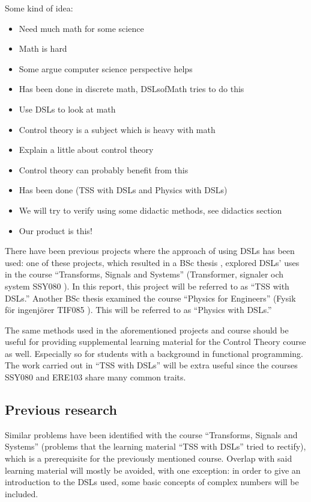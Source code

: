 \iffalse
Some kind of idea:
\begin{itemize}
    \item Need much math for some science
    \item Math is hard
    \item Some argue computer science perspective helps 
    \item Has been done in discrete math, DSLsofMath tries to do this %
    \item Use DSLs to look at math
    \item Control theory is a subject which is heavy with math
    \item Explain a little about control theory
    \item Control theory can probably benefit from this
    \item Has been done (TSS with DSLs and Physics with DSLs)
    \item We will try to verify using some didactic methods, see didactics section
    \item Our product is this!
\end{itemize}

There have been previous projects where the approach of using DSLs has been used: one of these projects, which resulted in a BSc thesis \cite{tssarbete}, explored DSLs' uses in the course ``Transforms, Signals and Systems'' (Transformer, signaler och system SSY080 \cite{SSY080}). In this report, this project will be referred to as ``TSS with DSLs.''
Another BSc thesis \cite{fysikarbete} examined the course ``Physics for Engineers'' (Fysik för ingenjörer TIF085 \cite{TIF085}). This will be referred to as ``Physics with DSLs.''

The same methods used in the aforementioned projects and course should be useful for providing supplemental learning material for the Control Theory course as well. Especially so for students with a background in functional programming. The work carried out in ``TSS with DSLs'' will be extra useful since the courses SSY080 and ERE103 share many common traits.





\subsection{Previous research}
Similar problems have been identified with the course ``Transforms, Signals and Systems'' (problems that the learning material ``TSS with DSLs'' \cite{tssarbete} tried to rectify), which is a prerequisite for the previously mentioned course. Overlap with said learning material will mostly be avoided, with one exception: in order to give an introduction to the DSLs used, some basic concepts of complex numbers will be included. 

